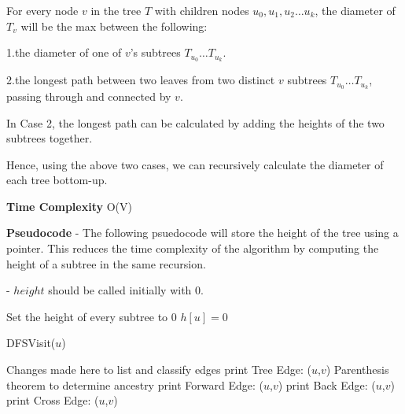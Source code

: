 \documentclass[a4paper]{report}
\begin{document}
      For every node $v$ in the tree $T$ with children nodes $u_{0}, u_{1}, u_{2} \dots u_{k}$, 
      the diameter of $T_{v}$ will be the max between the following:

      1.the diameter of one of $v$'s subtrees $T_{u_{0}} \dots T_{u_{k}}$.

      2.the longest path between two leaves from two distinct $v$ subtrees $T_{u_{0}} \dots T_{u_{k}}$, 
      passing through and connected by $v$.

      In Case 2, the longest path can be calculated by adding the heights of the two subtrees together. 

      Hence, using the above two cases, we can recursively calculate the diameter of each tree bottom-up. 

      {\bf Time Complexity}
      O(V)


      {\bf Pseudocode}
      - The following psuedocode will store the height of the tree using a pointer. This reduces the 
      time complexity of the algorithm by computing the height of a subtree in the same recursion.
      
      - $height$ should be called initially with 0.


      \begin{algorithmic}[1]
      \Comment Set the height of every subtree to 0
        \State $h[u] = 0$
      \EndFor


          \State DFSVisit($u$)
        \EndIf
      \EndFor

      \Comment Changes made here to list and classify edges
          \State print Tree Edge: ($u$,$v$)
        \Else 
          \Comment Parenthesis theorem to determine ancestry
            \State print Forward Edge: ($u$,$v$)
            \State print Back Edge: ($u$,$v$)
          \Else
            \State print Cross Edge: ($u$,$v$)
          \EndIf
        \EndIf
      \EndFor

    \EndFunction
    \end{algorithmic}
\end{document}
